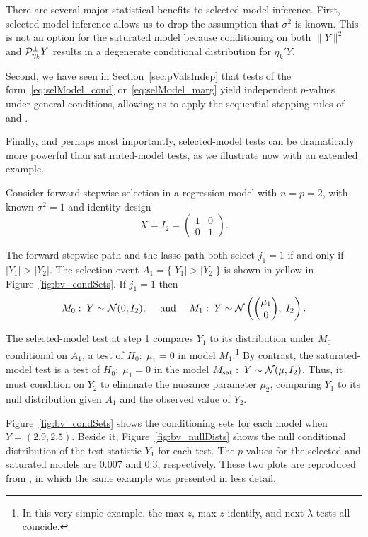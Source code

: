 \documentclass{article}
\begin{document}

There are several major statistical benefits to selected-model inference. First, selected-model inference allows us to drop the assumption that $\sigma^2$ is known. This is not an option for the saturated model because conditioning on both $\|Y\|^2$ and $\mathcal{P}_{\eta_k}^\perp Y$ results in a degenerate conditional distribution for $\eta_k'Y$.

Second, we have seen in Section~\ref{sec:pValsIndep} that tests of the form~\eqref{eq:selModel_cond} or~\eqref{eq:selModel_marg} yield independent $p$-values under general conditions, allowing us to apply  the sequential stopping rules of~\citet{gsell2013sequential} and \citet{li2015accumulation}.

Finally, and perhaps most importantly, selected-model tests can be dramatically more powerful than saturated-model tests, as we illustrate now with an extended example.

\begin{example}\label{ex:bivariate}
  Consider forward stepwise selection in a regression model with $n=p=2$, with known $\sigma^2=1$ and identity design 
\[
X = I_2=\begin{pmatrix} 1 & 0 \\ 0 & 1\end{pmatrix}.
\] 

The forward stepwise path and the lasso path both select $j_1=1$ if and only if $|Y_1|>|Y_2|$. The selection event $A_1=\{|Y_1| > |Y_2|\}$ is shown in yellow in Figure~\ref{fig:bv_condSets}. If $j_1=1$ then
\[
M_0:\; Y\sim \mathcal{N}(0,I_2), \quad \text{ and } \quad
M_1:\; Y \sim \mathcal{N}\left(\binom{\mu_1}{0}, \; I_2\right).
\]

The selected-model test at step 1 compares $Y_1$ to its distribution under $M_0$ conditional on $A_1$, a test of $H_0:\;\mu_1=0$ in model $M_1$.\footnote{In this very simple example, the max-$z$, max-$z$-identify, and next-$\lambda$ tests all coincide.} By contrast, the saturated-model test is a test of $H_0:\; \mu_1=0$ in the model $M_{\text{sat}}:\; Y \sim \mathcal{N}(\mu, I_2)$. Thus, it must condition on $Y_2$ to eliminate the nuisance parameter $\mu_2$, comparing $Y_1$ to its null distribution given $A_1$ and the observed value of $Y_2$.

Figure~\ref{fig:bv_condSets} shows the conditioning sets for each model when $Y=(2.9, 2.5)$. Beside it, Figure~\ref{fig:bv_nullDists} shows the null conditional distribution of the test statistic $Y_1$ for each test. The $p$-values for the selected and saturated models are 0.007 and 0.3, respectively. These two plots are reproduced from \citet{fithian2014optimal}, in which the same example was presented in less detail.
\end{example}
\end{document}
